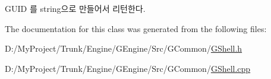 \begin{DoxyItemize}
\item G\+U\+I\+D 를 string으로 만들어서 리턴한다. 
\end{DoxyItemize}

The documentation for this class was generated from the following files\+:\begin{DoxyCompactItemize}
\item 
D\+:/\+My\+Project/\+Trunk/\+Engine/\+G\+Engine/\+Src/\+G\+Common/\hyperlink{_g_shell_8h}{G\+Shell.\+h}\item 
D\+:/\+My\+Project/\+Trunk/\+Engine/\+G\+Engine/\+Src/\+G\+Common/\hyperlink{_g_shell_8cpp}{G\+Shell.\+cpp}\end{DoxyCompactItemize}
